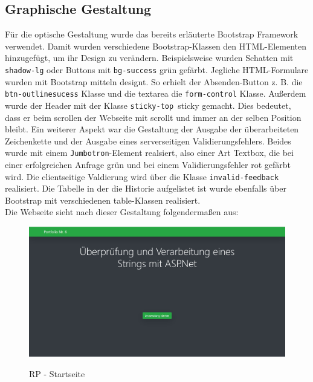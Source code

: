 \documentclass[a4paper,
12pt,
oneside]
{article}
\begin{document}
	\subsection{Graphische Gestaltung}
	Für die optische Gestaltung wurde das bereits erläuterte Bootstrap Framework verwendet. Damit wurden verschiedene Bootstrap-Klassen den HTML-Elementen hinzugefügt, um ihr Design zu verändern. Beispielsweise wurden Schatten mit \texttt{shadow-lg} oder Buttons mit \texttt{bg-success} grün gefärbt. Jegliche HTML-Formulare wurden mit Bootstrap mitteln designt. So erhielt der \glqq Absenden\grqq-Button z. B. die \texttt{btn-outline\-sucess} Klasse und die textarea die \texttt{form-control} Klasse. Außerdem wurde der Header mit der Klasse \texttt{sticky-top}~sticky gemacht. Dies bedeutet, dass er beim scrollen der Webseite mit scrollt und immer an der selben Position bleibt. Ein weiterer Aspekt war die Gestaltung der Ausgabe der überarbeiteten Zeichenkette und der Ausgabe eines serverseitigen Validierungsfehlers. Beides wurde mit einem \texttt{Jumbotron}-Element realsiert, also einer Art Textbox, die bei einer erfolgreichen Anfrage grün und bei einem Validierungsfehler rot gefärbt wird. Die clientseitige Valdierung wird über die Klasse \texttt{invalid-feedback} realisiert. Die Tabelle in der die Historie aufgelistet ist wurde ebenfalls über Bootstrap mit verschiedenen table-Klassen realisiert. \\
	Die Webseite sieht nach dieser Gestaltung folgendermaßen aus:
	\begin{figure}[h]
		\centering
		\caption{RP - Startseite}
		\includegraphics[width=1\textwidth]{img/startpage.jpg} \\
		\label{fig:startpage}
	\end{figure} \\
\end{document}
